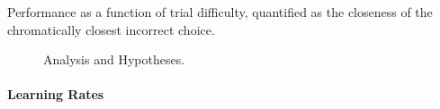 %
Performance as a function of trial difficulty, quantified as the closeness of the chromatically closest incorrect choice.

\begin{figure}

\caption{Analysis and Hypotheses.} 
\label{fig:BiasCalculation}
\end{figure}

\paragraph{Learning Rates}